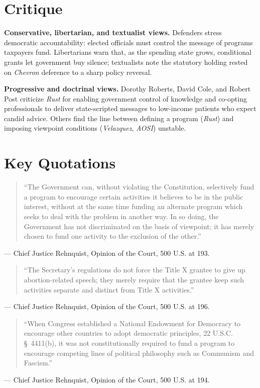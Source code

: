 \documentclass[12pt]{article}
\begin{document}
\section{Critique}

\textbf{Conservative, libertarian, and textualist views.} Defenders stress democratic accountability: elected officials must control the message of programs taxpayers fund. Libertarians warn that, as the spending state grows, conditional grants let government buy silence; textualists note the statutory holding rested on \textit{Chevron} deference to a sharp policy reversal.

\textbf{Progressive and doctrinal views.} Dorothy Roberts, David Cole, and Robert Post criticize \textit{Rust} for enabling government control of knowledge and co-opting professionals to deliver state-scripted messages to low-income patients who expect candid advice. Others find the line between defining a program (\textit{Rust}) and imposing viewpoint conditions (\textit{Velazquez}, \textit{AOSI}) unstable.

\section{Key Quotations}

\begin{quote}
``The Government can, without violating the Constitution, selectively fund a program to encourage certain activities it believes to be in the public interest, without at the same time funding an alternate program which seeks to deal with the problem in another way. In so doing, the Government has not discriminated on the basis of viewpoint; it has merely chosen to fund one activity to the exclusion of the other.''
\end{quote}
\noindent --- Chief Justice Rehnquist, Opinion of the Court, 500 U.S. at 193.

\begin{quote}
``The Secretary's regulations do not force the Title X grantee to give up abortion-related speech; they merely require that the grantee keep such activities separate and distinct from Title X activities.''
\end{quote}
\noindent --- Chief Justice Rehnquist, Opinion of the Court, 500 U.S. at 196.

\begin{quote}
``When Congress established a National Endowment for Democracy to encourage other countries to adopt democratic principles, 22 U.S.C. \S~4411(b), it was not constitutionally required to fund a program to encourage competing lines of political philosophy such as Communism and Fascism.''
\end{quote}
\noindent --- Chief Justice Rehnquist, Opinion of the Court, 500 U.S. at 194.
\end{document}
